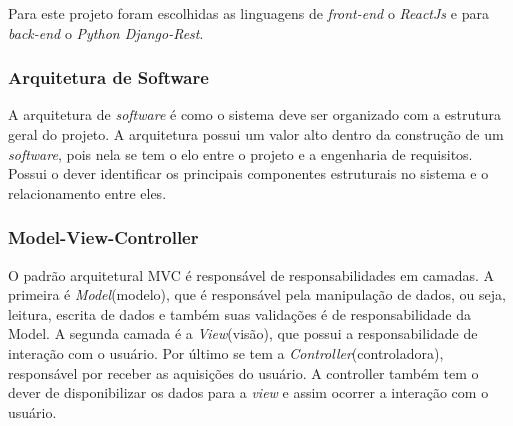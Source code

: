 Para este projeto foram escolhidas as linguagens de \textit{front-end} o \textit{ReactJs} e para \textit{back-end} o \textit{Python Django-Rest}.

\subsubsection{Arquitetura de Software}

A arquitetura de \textit{software} é como o sistema deve ser organizado com a estrutura geral do projeto. A arquitetura possui um valor alto dentro da construção de um \textit{software}, pois nela se tem o elo entre o projeto e a engenharia de requisitos. Possui o dever identificar os principais componentes estruturais no sistema e o relacionamento entre eles.

\subsubsection{Model-View-Controller}
\label{sec:mvc}

O padrão arquitetural MVC é responsável de responsabilidades em camadas. A primeira é \textit{Model}(modelo), que é responsável pela manipulação de dados, ou seja, leitura, escrita de dados e também suas validações é de responsabilidade da Model. A segunda camada é a \textit{View}(visão), que possui a responsabilidade de interação com o usuário. Por último se tem a \textit{Controller}(controladora), responsável por receber as aquisições do usuário. A controller também tem o dever de disponibilizar os dados para a \textit{view} e assim ocorrer a interação com o usuário.